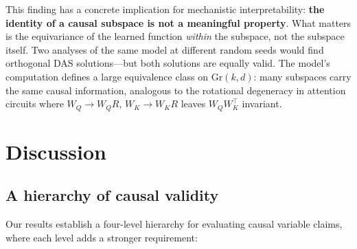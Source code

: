\documentclass{article}
\newcommand{\Gr}{\mathrm{Gr}}
\begin{document}
This finding has a concrete implication for mechanistic interpretability:
\textbf{the identity of a causal subspace is not a meaningful property}.
What matters is the equivariance of the learned function \emph{within} the
subspace, not the subspace itself. Two analyses of the same model at
different random seeds would find orthogonal DAS solutions---but both
solutions are equally valid. The model's computation defines a large
equivalence class on $\Gr(k,d)$: many subspaces carry the same causal
information, analogous to the rotational degeneracy in attention circuits
where $W_Q \to W_Q R$, $W_K \to W_K R$ leaves $W_Q W_K^\top$ invariant.

\section{Discussion}
\label{sec:discussion}

\subsection{A hierarchy of causal validity}

Our results establish a four-level hierarchy for evaluating causal variable
claims, where each level adds a stronger requirement:
\end{document}
